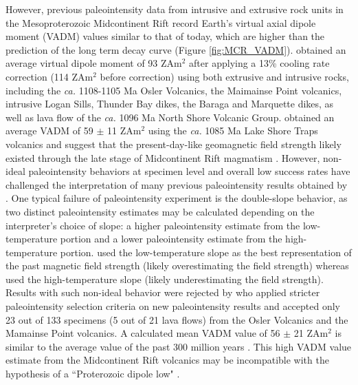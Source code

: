 \documentclass[draft]{agujournal2019}
\begin{document}
However, previous paleointensity data from intrusive and extrusive rock units in the Mesoproterozoic Midcontinent Rift \cite{Pesonen1983a, Kulakov2013a, Sprain2018a} record Earth's virtual axial dipole moment (VADM) values similar to that of today, which are higher than the prediction of the long term decay curve (Figure \ref{fig:MCR_VADM}).  obtained an average virtual dipole moment of 93 ZAm$^2$ after applying a 13\% cooling rate correction (114 ZAm$^2$ before correction) using both extrusive and intrusive rocks, including the \textit{ca.} 1108-1105 Ma Osler Volcanics, the Maimainse Point volcanics, intrusive Logan Sills, Thunder Bay dikes, the Baraga and Marquette dikes, as well as lava flow of the \textit{ca.} 1096 Ma North Shore Volcanic Group.  obtained an average VADM of 59 $\pm$ 11 ZAm$^2$ using the \textit{ca.} 1085 Ma Lake Shore Traps volcanics and suggest that the present-day-like geomagnetic field strength likely existed through the late stage of Midcontinent Rift magmatism \cite{Vervoort2007a, Miller2013a}. However, non-ideal paleointensity behaviors at specimen level and overall low success rates have challenged the interpretation of many previous paleointensity results obtained by . One typical failure of paleointensity experiment is the double-slope behavior, as two distinct paleointensity estimates may be calculated depending on the interpreter's choice of slope: a higher paleointensity estimate from the low-temperature portion and a lower paleointensity estimate from the high-temperature portion.  used the low-temperature slope as the best representation of the past magnetic field strength (likely overestimating the field strength) whereas  used the high-temperature slope (likely underestimating the field strength). Results with such non-ideal behavior were rejected by  who applied stricter paleointensity selection criteria on new paleointensity results and accepted only 23 out of 133 specimens (5 out of 21 lava flows) from the Osler Volcanics and the Mamainse Point volcanics. A calculated mean VADM value of 56 $\pm$ 21 ZAm$^2$ is similar to the average value of the past 300 million years \cite{Sprain2018a}. This high VADM value estimate from the Midcontinent Rift volcanics may be incompatible with the hypothesis of a ``Proterozoic dipole low" \cite{Biggin2009a}. 
\end{document}
